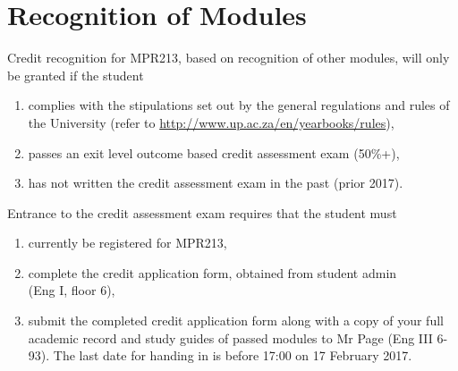 \newpage
\section{Recognition of Modules} \label{sec:credit_study_guide}
    \noindent
    Credit recognition for MPR213, based on recognition of other modules, will
    only be granted if the student
    \begin{enumerate}
        \item complies with the stipulations set out by the general regulations
            and rules of the University (refer to
            \url{http://www.up.ac.za/en/yearbooks/rules}),
        \item passes an exit level outcome based credit assessment exam (50\%+),
        \item has not written the credit assessment exam in the past (prior 2017).
    \end{enumerate}

    \noindent
    Entrance to the credit assessment exam requires that the student must
    \begin{enumerate}
        \item currently be registered for MPR213,
        \item complete the credit application form, obtained from student
            admin \\ (Eng I, floor 6),
        \item submit the completed credit application form along with a copy of
            your full academic record and study guides of passed modules to Mr
            Page (Eng III 6-93). The last date for handing in is before 17:00
            on 17 February 2017.
    \end{enumerate}

